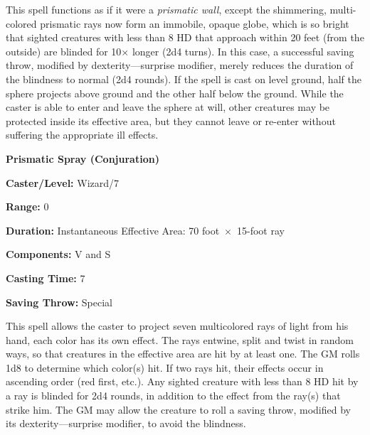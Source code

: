 \begin{multicols}{2}
This spell functions as if it were a \textit{prismatic wall}, except the shimmering, multi-colored prismatic rays now form an immobile, opaque globe, which is so bright that sighted creatures with less than 8 HD that approach within 20 feet (from the outside) are blinded for 10$\times$ longer (2d4 turns).  In this case, a successful saving throw, modified by dexterity---surprise modifier, merely reduces the duration of the blindness to normal (2d4 rounds).  If the spell is cast on level ground, half the sphere projects above ground and the other half below the ground.  While the caster is able to enter and leave the sphere at will, other creatures may be protected inside its effective area, but they cannot leave or re-enter without suffering the appropriate ill effects.

\vspace{1em}

\noindent
\begin{minipage}{\columnwidth}

\noindent \textbf{Prismatic Spray (Conjuration)}

\noindent \textbf{Caster/Level:} Wizard/7

\noindent \textbf{Range:} 0

\noindent \textbf{Duration:} Instantaneous
Effective Area: 70 foot~$\times$~15-foot ray

\noindent \textbf{Components:} V and S

\noindent \textbf{Casting Time:} 7

\noindent \textbf{Saving Throw:} Special

\end{minipage}

This spell allows the caster to project seven multicolored rays of light from his hand, each color has its own effect.  The rays entwine, split and twist in random ways, so that creatures in the effective area are hit by at least one.  The GM rolls 1d8 to determine which color(s) hit.  If two rays hit, their effects occur in ascending order (red first, etc.).  Any sighted creature with less than 8 HD hit by a ray is blinded for 2d4 rounds, in addition to the effect from the ray(s) that strike him.  The GM may allow the creature to roll a saving throw, modified by its dexterity---surprise modifier, to avoid the blindness.


\end{multicols}
